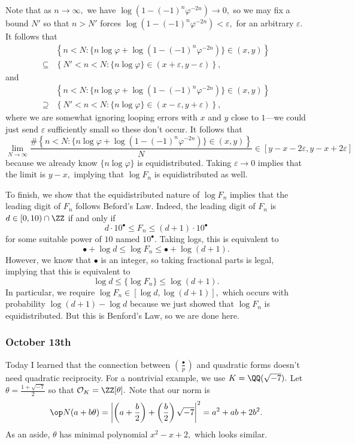 Note that as $n\to\infty,$ we have $\log\left(1-(-1)^n\varphi^{-2n}\right)\to0,$ so we may fix a bound $N'$ so that $n>N'$ forces $\log\left(1-(-1)^n\varphi^{-2n}\right)<\varepsilon,$ for an arbitrary $\varepsilon.$ It follows that
\begin{align*}
    & \left\{n<N:\{n\log\varphi+\log\left(1-(-1)^n\varphi^{-2n}\right)\}\in(x,y)\right\} \\
    \subseteq & \left\{N'<n<N:\{n\log\varphi\}\in(x+\varepsilon,y-\varepsilon)\right\},
\end{align*}
and
\begin{align*}
    & \left\{n<N:\{n\log\varphi+\log\left(1-(-1)^n\varphi^{-2n}\right)\}\in(x,y)\right\} \\
    \supseteq & \left\{N'<n<N:\{n\log\varphi\}\in(x-\varepsilon,y+\varepsilon)\right\},
\end{align*}
where we are somewhat ignoring looping errors with $x$ and $y$ close to $1$---we could just send $\varepsilon$ sufficiently small so these don't occur. It follows that
\[\lim_{N\to\infty}\frac{\#\left\{n<N:\{n\log\varphi+\log\left(1-(-1)^n\varphi^{-2n}\right)\}\in(x,y)\right\}}N\in[y-x-2\varepsilon,y-x+2\varepsilon]\]
because we already know $\{n\log\varphi\}$ is equidistributed. Taking $\varepsilon\to0$ implies that the limit is $y-x,$ implying that $\log F_n$ is equidistributed as well.

To finish, we show that the equidistributed nature of $\log F_n$ implies that the leading digit of $F_n$ follows Beford's Law. Indeed, the leading digit of $F_n$ is $d\in[0,10)\cap\ZZ$ if and only if
\[d\cdot10^\bullet\le F_n\le(d+1)\cdot10^\bullet\]
for some suitable power of $10$ named $10^\bullet.$ Taking logs, this is equivalent to
\[\bullet+\log d\le\log F_n\le\bullet+\log(d+1).\]
However, we know that $\bullet$ is an integer, so taking fractional parts is legal, implying that this is equivalent to
\[\log d\le\{\log F_n\}\le\log(d+1).\]
In particular, we require $\log F_n\in[\log d,\log(d+1)],$ which occurs with probability $\log(d+1)-\log d$ because we just showed that $\log F_n$ is equidistributed. But this is Benford's Law, so we are done here.

\subsubsection{October 13th}
Today I learned that the connection between $\left(\frac\bullet p\right)$ and quadratic forms doesn't need quadratic reciprocity. For a nontrivial example, we use $K=\QQ(\sqrt{-7}).$ Let $\theta=\frac{1+\sqrt{-7}}2$ so that $\mathcal O_K=\ZZ[\theta].$ Note that our norm is
\[\op N(a+b\theta)=\left|\left(a+\frac b2\right)+\left(\frac b2\right)\sqrt{-7}\right|^2=a^2+ab+2b^2.\]
As an aside, $\theta$ has minimal polynomial $x^2-x+2,$ which looks similar.


